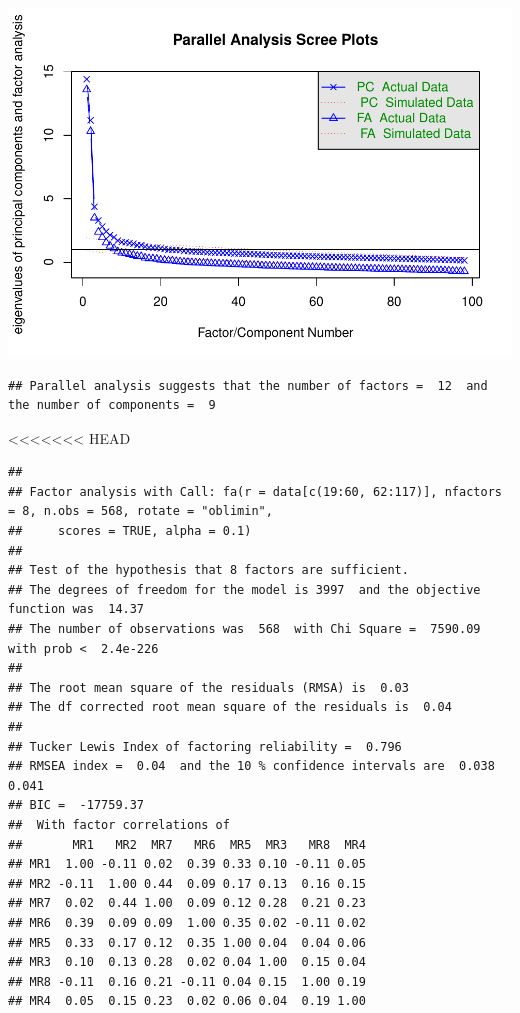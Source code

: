 \documentclass[
  english,
  man]{apa6}
\begin{document}
\includegraphics{SIOP_Onet_FA_files/figure-latex/scree plot-1.pdf}

\begin{verbatim}
## Parallel analysis suggests that the number of factors =  12  and the number of components =  9
\end{verbatim}

\textless\textless\textless\textless\textless\textless\textless{} HEAD

\begin{verbatim}
## 
## Factor analysis with Call: fa(r = data[c(19:60, 62:117)], nfactors = 8, n.obs = 568, rotate = "oblimin", 
##     scores = TRUE, alpha = 0.1)
## 
## Test of the hypothesis that 8 factors are sufficient.
## The degrees of freedom for the model is 3997  and the objective function was  14.37 
## The number of observations was  568  with Chi Square =  7590.09  with prob <  2.4e-226 
## 
## The root mean square of the residuals (RMSA) is  0.03 
## The df corrected root mean square of the residuals is  0.04 
## 
## Tucker Lewis Index of factoring reliability =  0.796
## RMSEA index =  0.04  and the 10 % confidence intervals are  0.038 0.041
## BIC =  -17759.37
##  With factor correlations of 
##       MR1   MR2  MR7   MR6  MR5  MR3   MR8  MR4
## MR1  1.00 -0.11 0.02  0.39 0.33 0.10 -0.11 0.05
## MR2 -0.11  1.00 0.44  0.09 0.17 0.13  0.16 0.15
## MR7  0.02  0.44 1.00  0.09 0.12 0.28  0.21 0.23
## MR6  0.39  0.09 0.09  1.00 0.35 0.02 -0.11 0.02
## MR5  0.33  0.17 0.12  0.35 1.00 0.04  0.04 0.06
## MR3  0.10  0.13 0.28  0.02 0.04 1.00  0.15 0.04
## MR8 -0.11  0.16 0.21 -0.11 0.04 0.15  1.00 0.19
## MR4  0.05  0.15 0.23  0.02 0.06 0.04  0.19 1.00
\end{verbatim}
\end{document}
